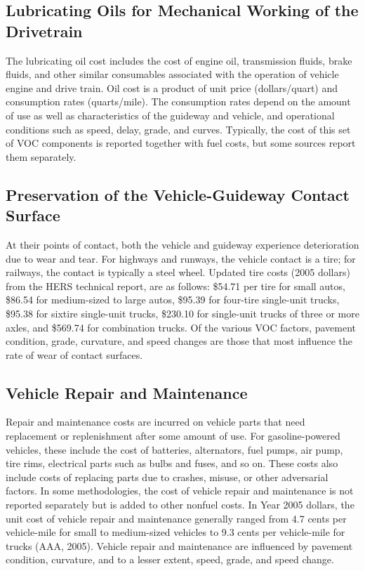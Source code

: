 \subsection{Lubricating Oils for Mechanical Working of the Drivetrain}
The lubricating oil cost includes the cost of engine oil, transmission fluids, brake fluids, and other similar consumables associated with the operation of vehicle engine and drive train. Oil cost is a product of unit price (dollars/quart) and consumption rates (quarts/mile). The consumption rates depend on the amount of use as well as characteristics of the guideway and vehicle, and operational conditions such as speed, delay, grade, and curves. Typically, the cost of this set of VOC components is reported together with fuel costs, but some sources report them separately.
\subsection{Preservation of the Vehicle-Guideway Contact Surface}
At their points of contact, both the vehicle and guideway experience deterioration due to wear and tear. For highways and runways, the vehicle contact is a tire; for railways, the contact is typically a steel wheel. Updated tire costs (2005 dollars) from the HERS technical report, are as follows: \$54.71 per tire for small autos, \$86.54 for medium-sized to large autos, \$95.39 for four-tire single-unit trucks, \$95.38 for sixtire single-unit trucks, \$230.10 for single-unit trucks of three or more axles, and \$569.74 for combination trucks. Of the various VOC factors, pavement condition, grade, curvature, and speed changes are those that most influence the rate of wear of contact surfaces.
\subsection{Vehicle Repair and Maintenance}
Repair and maintenance costs are incurred on vehicle parts that need replacement or replenishment after some amount of use. For gasoline-powered vehicles, these include the cost of batteries, alternators, fuel pumps, air pump, tire rims, electrical parts such as bulbs and fuses, and so on. These costs also include costs of replacing parts due to crashes, misuse, or other adversarial factors. In some methodologies, the cost of vehicle repair and maintenance is not reported separately but is added to other nonfuel costs. In Year 2005 dollars, the unit cost of vehicle repair and maintenance generally ranged from 4.7 cents per vehicle-mile for small to medium-sized vehicles to 9.3 cents per vehicle-mile for trucks (AAA, 2005). Vehicle repair and maintenance are influenced by pavement condition, curvature, and to a lesser extent, speed, grade, and speed change.
